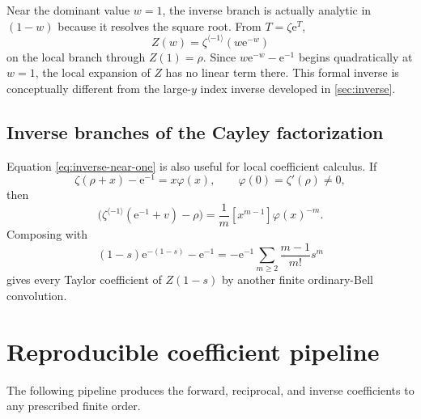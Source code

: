 \documentclass[11pt]{article}
\theoremstyle{definition}
\theoremstyle{remark}
\newcommand{\e}{\mathrm e}
\newcommand{\invcomp}{\langle-1\rangle}
\begin{document}
Near the dominant value $w=1$, the inverse branch is actually analytic in
$(1-w)$ because it resolves the square root.  From
$T=\zeta\e^T$,
\begin{equation}
 Z(w)=\zeta^{\invcomp}(w\e^{-w})
 \label{eq:inverse-near-one}
\end{equation}
on the local branch through $Z(1)=\rho$.  Since
$w\e^{-w}-\e^{-1}$ begins quadratically at $w=1$, the local expansion of $Z$
has no linear term there.  This formal inverse is conceptually different from
the large-$y$ index inverse developed in \cref{sec:inverse}.

\subsection{Inverse branches of the Cayley factorization}

Equation \cref{eq:inverse-near-one} is also useful for local coefficient
calculus.  If
\begin{equation}
 \zeta(\rho+x)-\e^{-1}=x\varphi(x),
 \qquad \varphi(0)=\zeta'(\rho)\neq0,
\end{equation}
then
\begin{equation}
 [v^m]\bigl(\zeta^{\invcomp}(\e^{-1}+v)-\rho\bigr)
 =\frac1m[x^{m-1}]\varphi(x)^{-m}.
 \label{eq:zeta-local-inverse}
\end{equation}
Composing with
\[
 (1-s)\e^{-(1-s)}-\e^{-1}
 =-\e^{-1}\sum_{m\geq2}\frac{m-1}{m!}s^m
\]
gives every Taylor coefficient of $Z(1-s)$ by another finite ordinary-Bell
convolution.

\section{Reproducible coefficient pipeline}
\label{sec:pipeline}

The following pipeline produces the forward, reciprocal, and inverse
coefficients to any prescribed finite order.
\end{document}
